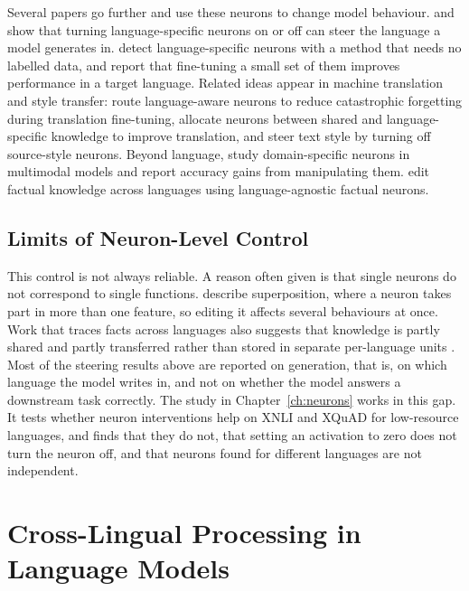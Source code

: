 Several papers go further and use these neurons to change model behaviour.
\citet{tang2024language} and \citet{kojima2024multilingual} show that turning
language-specific neurons on or off can steer the language a model generates in.
\citet{zhao2024multilingualism} detect language-specific neurons with a method
that needs no labelled data, and report that fine-tuning a small set of them
improves performance in a target language. Related ideas appear in machine
translation and style transfer: \citet{zhu2024landermt} route language-aware
neurons to reduce catastrophic forgetting during translation fine-tuning,
\citet{xie2021importance} allocate neurons between shared and language-specific
knowledge to improve translation, and \citet{lai2024style} steer text style by
turning off source-style neurons. Beyond language, \citet{huo2024mmneuron} study
domain-specific neurons in multimodal models and report accuracy gains from
manipulating them. \citet{zhang2024multilingual} edit factual knowledge across
languages using language-agnostic factual neurons.

\subsection{Limits of Neuron-Level Control}
\label{sec:rw-neurons-limits}

This control is not always reliable. A reason often given is that single neurons
do not correspond to single functions. \citet{elhage2022superposition} describe
superposition, where a neuron takes part in more than one feature, so editing it
affects several behaviours at once. Work that traces facts across languages also
suggests that knowledge is partly shared and partly transferred rather than stored
in separate per-language units \citep{zhao2024tracing}. Most of the steering
results above are reported on generation, that is, on which language the model
writes in, and not on whether the model answers a downstream task correctly. The
study in Chapter~\ref{ch:neurons} \citep{mondal2025language} works in this gap. It
tests whether neuron interventions help on XNLI \citep{conneau2018xnli} and XQuAD
\citep{artetxe2020cross} for low-resource languages, and finds that they do not,
that setting an activation to zero does not turn the neuron off, and that neurons
found for different languages are not independent.

\section{Cross-Lingual Processing in Language Models}
\label{sec:rw-crosslingual}

